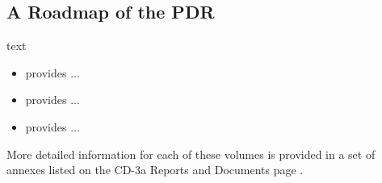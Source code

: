 \subsection{A Roadmap of the PDR}

text 
\begin{itemize}
 \item \volintro{} provides ... \fixme{}
 \item \volfscf{} provides ... \fixme{}
 \item \volcryo{} provides ... \fixme{}
\end{itemize}

More detailed information for each of these volumes is provided in a set of annexes listed on the CD-3a Reports and Documents page .
